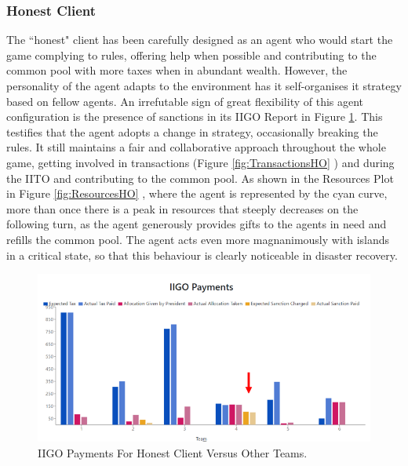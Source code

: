 \subsubsection{Honest Client} \label{honestAO}
The “honest" client has been carefully designed as an agent who would start the game complying to rules, offering help when possible and contributing to the common pool with more taxes when in abundant wealth. However, the personality of the agent adapts to the environment has it self-organises it strategy based on fellow agents. An irrefutable sign of great flexibility of this agent configuration is the presence of sanctions in its IIGO Report in Figure \ref{fig:IIGOHO}.
This testifies that the agent adopts a change in strategy, occasionally breaking the rules. It still maintains a fair and collaborative approach throughout the whole game, getting involved in transactions (Figure \ref{fig:TransactionsHO} ) and during the IITO and contributing to the common pool. As shown in the Resources Plot in Figure \ref{fig:ResourcesHO} , where the agent is represented by the cyan curve, more than once there is a peak in resources that steeply decreases on the following turn, as the agent generously provides gifts to the agents in need and refills the common pool. The agent acts even more magnanimously with islands in a critical state, so that this behaviour is clearly noticeable in disaster recovery.
\begin{figure}[H]
\centering
\includegraphics[scale=0.6]{12_team4_agentdesign/images/IIGOHO.PNG}
\caption{IIGO Payments For Honest Client Versus Other Teams.}
\label{fig:IIGOHO}
\end{figure}

